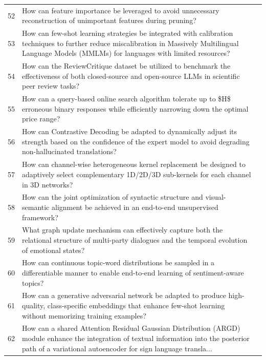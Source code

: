 \begin{longtable}{p{0.8cm}p{9cm}p{2.5cm}}
52 & How can feature importance be leveraged to avoid unnecessary reconstruction of unimportant features during pruning? & \cite{10.1609/aaai.v34i07.6720} \\
53 & How can few-shot learning strategies be integrated with calibration techniques to further reduce miscalibration in Massively Multilingual Language Models (MMLMs) for languages with limited resources? & \cite{10.18653/v1/2022.emnlp-main.290} \\
54 & How can the ReviewCritique dataset be utilized to benchmark the effectiveness of both closed-source and open-source LLMs in scientific peer review tasks? & \cite{10.18653/v1/2024.emnlp-main.292} \\
55 & How can a query-based online search algorithm tolerate up to \$H\$ erroneous binary responses while efficiently narrowing down the optimal price range? & \cite{10.1609/aaai.v36i9.21199} \\
56 & How can Contrastive Decoding be adapted to dynamically adjust its strength based on the confidence of the expert model to avoid degrading non-hallucinated translations? & \cite{10.18653/v1/2024.eacl-long.155} \\
57 & How can channel-wise heterogeneous kernel replacement be designed to adaptively select complementary 1D/2D/3D sub-kernels for each channel in 3D networks? & \cite{10.1609/aaai.v35i4.16433} \\
58 & How can the joint optimization of syntactic structure and visual-semantic alignment be achieved in an end-to-end unsupervised framework? & \cite{10.18653/v1/n19-1180} \\
59 & What graph update mechanism can effectively capture both the relational structure of multi-party dialogues and the temporal evolution of emotional states? & \cite{10.18653/v1/2022.acl-long.24} \\
60 & How can continuous topic-word distributions be sampled in a differentiable manner to enable end-to-end learning of sentiment-aware topics? & \cite{10.18653/v1/2021.eacl-main.199} \\
61 & How can a generative adversarial network be adapted to produce high-quality, class-specific embeddings that enhance few-shot learning without memorizing training examples? & \cite{10.18653/v1/2022.naacl-main.404} \\
62 & How can a shared Attention Residual Gaussian Distribution (ARGD) module enhance the integration of textual information into the posterior path of a variational autoencoder for sign language transla... & \cite{10.1609/aaai.v38i17.29937} \\

\end{longtable}
